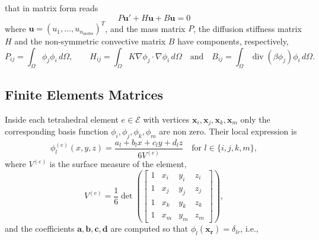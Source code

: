 \documentclass[hidelinks]{article}
\DeclareMathOperator{\divg}{div}
\begin{document}
that in matrix form reads \[ P\mathbf{u}' + H\mathbf{u} + B\mathbf{u} = 0\] where $\mathbf{u} = (u_1, \dots, u_{n_\text{nodes}})^T$, and the mass matrix $P$, the diffusion stiffness matrix $H$ and the non-symmetric convective matrix $B$ have components, respectively,
\[P_{ij} = \int_\Omega \phi_j \phi_i\, d\Omega ,\quad\quad H_{ij} = \int_\Omega K \nabla \phi_j \cdot \nabla \phi_i\, d\Omega \quad \text{and} \quad B_{ij} = \int_\Omega  \divg( \beta \phi_j) \phi_i\,d\Omega.\]

\subsection{Finite Elements Matrices}

Inside each tetrahedral element $e\in\mathcal{E}$ with vertices $\mathbf{x}_i, \mathbf{x}_j, \mathbf{x}_k, \mathbf{x}_m$ only the corresponding basis function $\phi_i,\phi_j,\phi_k,\phi_m$ are non zero. Their local expression is 
\[
\phi_l^{(e)} (x,y,z)= \frac{a_l + b_l x + c_l y + d_l z}{6V^{(e)}} \quad \text{for } l \in \{i,j,k,m\},
\]
where $V^{(e)}$ is the surface measure of the element,
\[
V^{(e)} = \frac{1}{6}\det \left(\begin{bmatrix}
    1 & x_i & y_i & z_i \\ 1 & x_j & y_j & z_j\\ 1 & x_k & y_k & z_k \\ 1 & x_m & y_m & z_m
\end{bmatrix} \right),
\]
and the coefficients $\mathbf{a}, \mathbf{b}, \mathbf{c}, \mathbf{d}$ are computed so that $\phi_l(\mathbf{x_r}) = \delta_{lr}$, i.e., 
\end{document}
